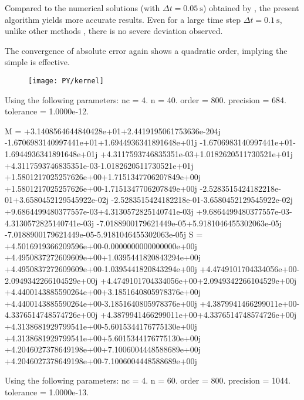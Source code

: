 Compared to the numerical solutions (with $\Delta{}t=\SI{0.05}{\second}$) obtained by \citet{Cortes2009}, the present algorithm yields more accurate results. Even for a large time step $\Delta{}t=\SI{0.1}{\second}$, unlike other methods \citep{Liu2023}, there is no severe deviation observed.

The convergence of absolute error again shows a quadratic order, implying the simple  is effective.


\begin{figure}[H]
\centering
\texttt{[image: PY/kernel]}
\end{figure}

Using the following parameters:
        nc = 4.
         n = 40.
     order = 800.
 precision = 684.
 tolerance = 1.0000e-12.

M =
+3.1408564644840428e+01+2.4419195061753636e-204j
-1.6706983140997441e+01+1.6944936341891648e+01j
-1.6706983140997441e+01-1.6944936341891648e+01j
+4.3117593746835351e-03+1.0182620511730521e+01j
+4.3117593746835351e-03-1.0182620511730521e+01j
+1.5801217025257626e+00+1.7151347706207849e+00j
+1.5801217025257626e+00-1.7151347706207849e+00j
-2.5283515424182218e-01+3.6580452129545922e-02j
-2.5283515424182218e-01-3.6580452129545922e-02j
+9.6864499480377557e-03+4.3130572825140741e-03j
+9.6864499480377557e-03-4.3130572825140741e-03j
-7.0188900179621449e-05+5.9181046455302063e-05j
-7.0188900179621449e-05-5.9181046455302063e-05j
S =
+4.5016919366209596e+00-0.0000000000000000e+00j
+4.4950837272609609e+00+1.0395441820843294e+00j
+4.4950837272609609e+00-1.0395441820843294e+00j
+4.4749101704334056e+00-2.0949342266104529e+00j
+4.4749101704334056e+00+2.0949342266104529e+00j
+4.4400143885590264e+00+3.1851640805978376e+00j
+4.4400143885590264e+00-3.1851640805978376e+00j
+4.3879941466299011e+00-4.3376514748574726e+00j
+4.3879941466299011e+00+4.3376514748574726e+00j
+4.3138681929799541e+00-5.6015344176775130e+00j
+4.3138681929799541e+00+5.6015344176775130e+00j
+4.2046027378649198e+00+7.1006004448588689e+00j
+4.2046027378649198e+00-7.1006004448588689e+00j


Using the following parameters:
        nc = 4.
         n = 60.
     order = 800.
 precision = 1044.
 tolerance = 1.0000e-13.

